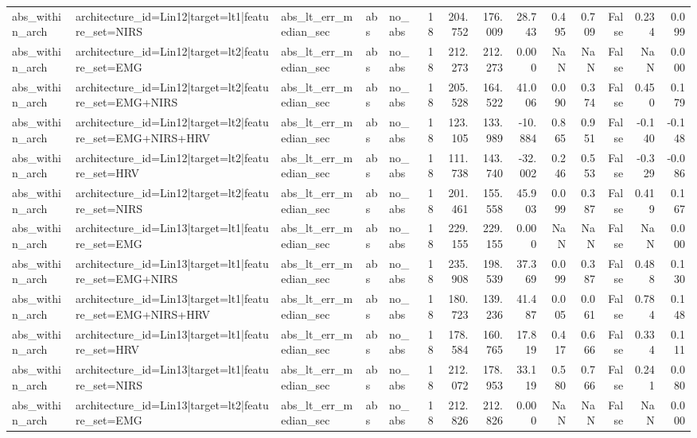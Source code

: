 \begin{table}
\begin{tabular}{lllllrrrrrrrrr}
abs_within_arch & architecture_id=Lin12|target=lt1|feature_set=NIRS & abs_lt_err_median_sec & abs & no_abs & 18 & 204.752 & 176.009 & 28.743 & 0.495 & 0.709 & False & 0.234 & 0.099 \\
abs_within_arch & architecture_id=Lin12|target=lt2|feature_set=EMG & abs_lt_err_median_sec & abs & no_abs & 18 & 212.273 & 212.273 & 0.000 & NaN & NaN & False & NaN & 0.000 \\
abs_within_arch & architecture_id=Lin12|target=lt2|feature_set=EMG+NIRS & abs_lt_err_median_sec & abs & no_abs & 18 & 205.528 & 164.522 & 41.006 & 0.090 & 0.374 & False & 0.450 & 0.179 \\
abs_within_arch & architecture_id=Lin12|target=lt2|feature_set=EMG+NIRS+HRV & abs_lt_err_median_sec & abs & no_abs & 18 & 123.105 & 133.989 & -10.884 & 0.865 & 0.951 & False & -0.140 & -0.148 \\
abs_within_arch & architecture_id=Lin12|target=lt2|feature_set=HRV & abs_lt_err_median_sec & abs & no_abs & 18 & 111.738 & 143.740 & -32.002 & 0.246 & 0.553 & False & -0.329 & -0.086 \\
abs_within_arch & architecture_id=Lin12|target=lt2|feature_set=NIRS & abs_lt_err_median_sec & abs & no_abs & 18 & 201.461 & 155.558 & 45.903 & 0.099 & 0.387 & False & 0.419 & 0.167 \\
abs_within_arch & architecture_id=Lin13|target=lt1|feature_set=EMG & abs_lt_err_median_sec & abs & no_abs & 18 & 229.155 & 229.155 & 0.000 & NaN & NaN & False & NaN & 0.000 \\
abs_within_arch & architecture_id=Lin13|target=lt1|feature_set=EMG+NIRS & abs_lt_err_median_sec & abs & no_abs & 18 & 235.908 & 198.539 & 37.369 & 0.099 & 0.387 & False & 0.488 & 0.130 \\
abs_within_arch & architecture_id=Lin13|target=lt1|feature_set=EMG+NIRS+HRV & abs_lt_err_median_sec & abs & no_abs & 18 & 180.723 & 139.236 & 41.487 & 0.005 & 0.061 & False & 0.784 & 0.148 \\
abs_within_arch & architecture_id=Lin13|target=lt1|feature_set=HRV & abs_lt_err_median_sec & abs & no_abs & 18 & 178.584 & 160.765 & 17.819 & 0.417 & 0.666 & False & 0.334 & 0.111 \\
abs_within_arch & architecture_id=Lin13|target=lt1|feature_set=NIRS & abs_lt_err_median_sec & abs & no_abs & 18 & 212.072 & 178.953 & 33.119 & 0.580 & 0.766 & False & 0.241 & 0.080 \\
abs_within_arch & architecture_id=Lin13|target=lt2|feature_set=EMG & abs_lt_err_median_sec & abs & no_abs & 18 & 212.826 & 212.826 & 0.000 & NaN & NaN & False & NaN & 0.000 \\

\end{tabular}
\end{table}
